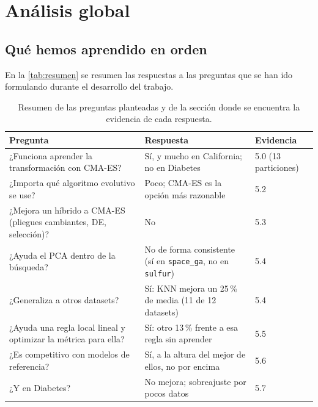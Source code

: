 \section{Análisis global}
\subsection{Qué hemos aprendido en orden}

En la \autoref{tab:resumen} se resumen las respuestas a las preguntas que se han ido formulando durante el desarrollo del trabajo. 

\begin{table}[h]
\centering
\begin{tabular}{p{5.2cm}p{6.3cm}p{1.8cm}}
\hline
\textbf{Pregunta} & \textbf{Respuesta} & \textbf{Evidencia} \\
\hline
¿Funciona aprender la transformación con CMA-ES? & Sí, y mucho en California; no en Diabetes & 5.0 (13 particiones) \\
\hline
¿Importa qué algoritmo evolutivo se use? & Poco; CMA-ES es la opción más razonable & 5.2 \\
\hline
¿Mejora un híbrido a CMA-ES (pliegues cambiantes, DE, selección)? & No & 5.3 \\
\hline
¿Ayuda el PCA dentro de la búsqueda? & No de forma consistente (sí en \texttt{space\_ga}, no en \texttt{sulfur}) & 5.4 \\
\hline
¿Generaliza a otros datasets? & Sí: KNN mejora un 25\,\% de media (11 de 12 datasets) & 5.4 \\
\hline
¿Ayuda una regla local lineal y optimizar la métrica para ella? & Sí: otro 13\,\% frente a esa regla sin aprender & 5.5 \\
\hline
¿Es competitivo con modelos de referencia? & Sí, a la altura del mejor de ellos, no por encima & 5.6 \\
\hline
¿Y en Diabetes? & No mejora; sobreajuste por pocos datos & 5.7 \\
\hline
\end{tabular}
\caption{Resumen de las preguntas planteadas y de la sección donde se encuentra la evidencia de cada respuesta.}
\label{tab:resumen}
\end{table}

